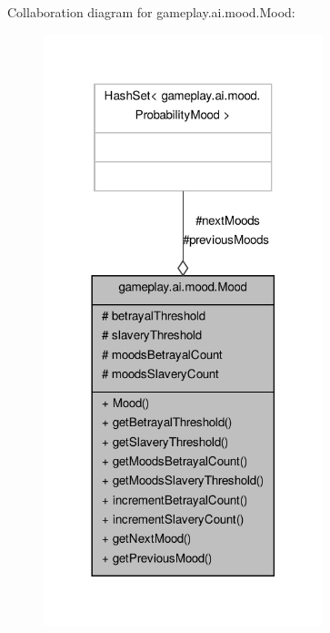 Collaboration diagram for gameplay.\-ai.\-mood.\-Mood\-:
\nopagebreak
\begin{figure}[H]
\begin{center}
\leavevmode
\includegraphics[width=230pt]{a00111}
\end{center}
\end{figure}
